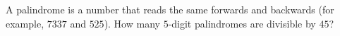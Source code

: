 A palindrome is a number that reads the same forwards and backwards (for example, $7337$ and $525$). How many $5$-digit palindromes are divisible by $45$?
